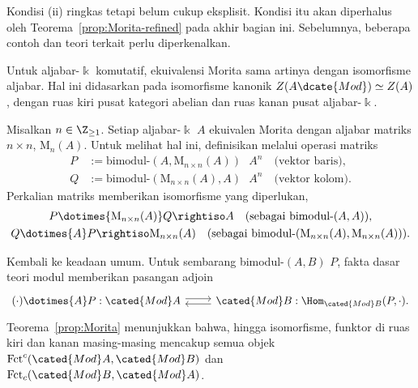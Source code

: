 Kondisi (ii) ringkas tetapi belum cukup eksplisit. Kondisi itu akan
diperhalus oleh Teorema~\ref{prop:Morita-refined} pada akhir bagian ini.
Sebelumnya, beberapa contoh dan teori terkait perlu diperkenalkan.

\begin{example}
	Untuk aljabar-$\Bbbk$ komutatif, ekuivalensi Morita sama artinya dengan
	isomorfisme aljabar. Hal ini didasarkan pada isomorfisme kanonik
	$Z(A\dcate{Mod})\simeq Z(A)$, dengan ruas kiri pusat kategori abelian dan ruas
	kanan pusat aljabar-$\Bbbk$.
\end{example}

\begin{example}
	Misalkan $n\in\Z_{\geq1}$. Setiap aljabar-$\Bbbk$ $A$ ekuivalen Morita
	dengan aljabar matriks $n\times n$, $\mathrm{M}_n(A)$. Untuk melihat hal
	ini, definisikan melalui operasi matriks
	\begin{align*}
		P & := \text{bimodul-$(A,\mathrm{M}_{n \times n}(A))$ } A^n \quad \text{(vektor baris)}, \\
		Q & := \text{bimodul-$(\mathrm{M}_{n \times n}(A),A)$ } A^n \quad \text{(vektor kolom)}.
	\end{align*}
	Perkalian matriks memberikan isomorfisme yang diperlukan,
	\begin{gather*}
		P \dotimes{\mathrm{M}_{n \times n}(A)} Q \rightiso A \quad \text{(sebagai bimodul-$(A,A)$)}, \\
		Q \dotimes{A} P \rightiso \mathrm{M}_{n \times n}(A) \quad \text{(sebagai bimodul-$(\mathrm{M}_{n \times n}(A), \mathrm{M}_{n \times n}(A))$)}.
	\end{gather*}
\end{example}

Kembali ke keadaan umum. Untuk sembarang bimodul-$(A,B)$ $P$, fakta dasar
teori modul \cite[Teorema 6.6.5]{Li1} memberikan pasangan adjoin
\begin{equation}\label{eqn:AB-adjunction}\begin{tikzcd}
	(\cdot) \dotimes{A} P : \cated{Mod}A \arrow[shift left, r] & \cated{Mod}B: \Hom_{\cated{Mod}B}(P, \cdot). \arrow[shift left, l]
\end{tikzcd}\end{equation}
Teorema~\ref{prop:Morita} menunjukkan bahwa, hingga isomorfisme, funktor di
ruas kiri dan kanan masing-masing mencakup semua objek
$\mathrm{Fct}^c(\cated{Mod}A,\cated{Mod}B)$ dan
$\mathrm{Fct}_c(\cated{Mod}B,\cated{Mod}A)$.

